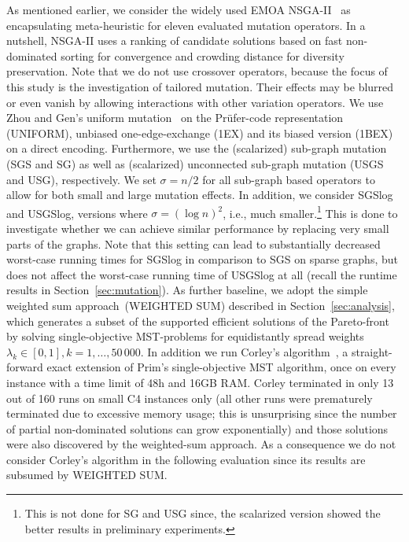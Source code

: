 \documentclass[twoside]{article}
\begin{document}
As mentioned earlier, we consider the widely used EMOA NSGA-II~\citep{DPAM02} as encapsulating meta-heuristic for eleven evaluated mutation operators. In a nutshell, NSGA-II uses a ranking of candidate solutions based on fast non-dominated sorting for convergence and crowding distance for diversity preservation.
Note that we do not use crossover operators, because the focus of this study is the investigation of tailored mutation. Their effects may be blurred or even vanish by allowing interactions with other variation operators.
We use Zhou and Gen's uniform mutation~\citep{ZG99} on the Pr\"ufer-code representation (UNIFORM), unbiased one-edge-exchange (1EX) and its biased version (1BEX) on a direct encoding. Furthermore, we use the (scalarized) sub-graph mutation (SGS and SG) as well as (scalarized) unconnected sub-graph mutation (USGS and USG), respectively. We set $\sigma = n/2$ for all sub-graph based operators to allow for both small and large mutation effects. In addition, we consider SGSlog and USGSlog, versions where $\sigma = (\log n)^2$, i.e., much smaller.\footnote{This is not done for SG and USG since, the scalarized version showed the better results in preliminary experiments.} This is done to investigate whether we can achieve similar performance by replacing very small parts of the graphs. Note that this setting can lead to substantially decreased worst-case running times for SGSlog in comparison to SGS on sparse graphs, but does not affect the worst-case running time of USGSlog at all (recall the runtime results in Section~\ref{sec:mutation}).
As further baseline, we adopt the simple weighted sum approach~(WEIGHTED SUM) described in Section~\ref{sec:analysis}, which generates a subset of the supported efficient solutions of the Pareto-front by solving single-objective MST-problems for equidistantly spread weights $\lambda_k \in [0, 1], k = 1, \ldots, 50\,000$.
In addition we run Corley's algorithm~\citep{Corley1985}, a straight-forward exact extension of Prim's single-objective MST algorithm, once on every instance with a time limit of 48h and 16GB RAM. Corley terminated in only 13 out of 160 runs on small C4 instances only (all other runs were prematurely terminated due to excessive memory usage; this is unsurprising since the number of partial non-dominated solutions can grow exponentially) and those solutions were also discovered by the weighted-sum approach. As a consequence we do not consider Corley's algorithm in the following evaluation since its results are subsumed by WEIGHTED SUM.
\end{document}
